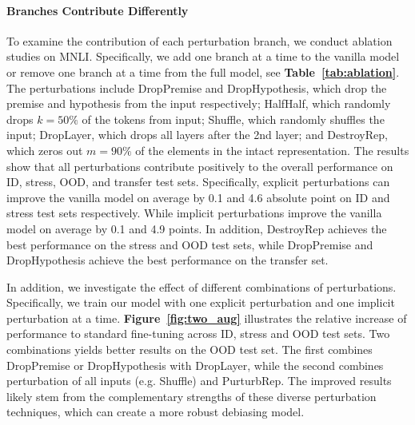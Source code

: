 \paragraph{Branches Contribute Differently}
To examine the contribution of each perturbation branch, we conduct ablation studies on MNLI. Specifically, we add one branch at a time to the vanilla model or remove one branch at a time from the full model, see \textbf{Table~\ref{tab:ablation}}. The perturbations include DropPremise and DropHypothesis, which drop the premise and hypothesis from the input respectively; HalfHalf, which randomly drops $k=50\%$ of the tokens from input; Shuffle, which randomly shuffles the input; 
DropLayer, which drops all layers after the 2nd layer; and
DestroyRep, which zeros out $m=90\%$ of the elements in the intact representation. 
%
The results show that all perturbations contribute positively to the overall performance on ID, stress, OOD, and transfer test sets. Specifically, explicit perturbations can improve the vanilla model on average by 0.1 and 4.6 absolute point on ID and stress test sets respectively. While implicit perturbations improve the vanilla model on average by 0.1 and 4.9 points. In addition, DestroyRep achieves the best performance on the  stress and OOD test sets, while DropPremise and DropHypothesis achieve the best performance on the transfer set. 


In addition, we investigate the effect of different combinations of perturbations. Specifically, we train our model with one explicit perturbation and one implicit perturbation at a time. \textbf{Figure~\ref{fig:two_aug}} illustrates the relative increase of performance to standard fine-tuning across ID, stress and OOD test sets. 
%
Two combinations yields better results on the OOD test set. The first combines DropPremise or DropHypothesis with DropLayer, while the second combines perturbation of all inputs (e.g. Shuffle) and PurturbRep. The improved results likely stem from the complementary strengths of these diverse perturbation techniques, which can create a more robust debiasing model. 

